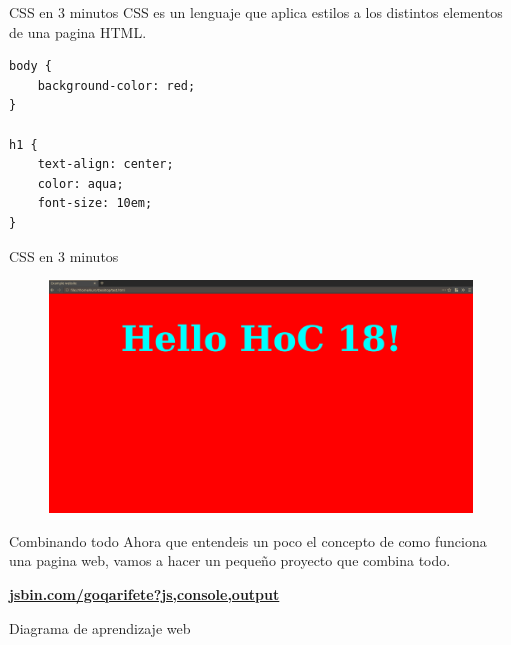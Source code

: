 \documentclass{beamer}
\begin{document}
\begin{frame}[fragile]{CSS en 3 minutos}
CSS es un lenguaje que aplica estilos a los distintos elementos de una pagina HTML.
\begin{lstlisting}
body {
    background-color: red;
}

h1 {
    text-align: center;
    color: aqua;
    font-size: 10em;
}
\end{lstlisting}
\end{frame}


\begin{frame}{CSS en 3 minutos}
\begin{figure}
    \centering
    \includegraphics[width=\textwidth]{images/helloworldcss.png}
\end{figure}
\end{frame}

\begin{frame}{Combinando todo}
    Ahora que entendeis un poco el concepto de como funciona una pagina web, vamos a hacer un pequeño proyecto que combina todo.
    
    \centering\textbf{\hyperlink{https://jsbin.com/goqarifete/1/edit?js,console,output}{\Large jsbin.com/goqarifete?js,console,output}}
\end{frame}

\begin{frame}[fragile]{Diagrama de aprendizaje web}
\end{frame}
\end{document}
